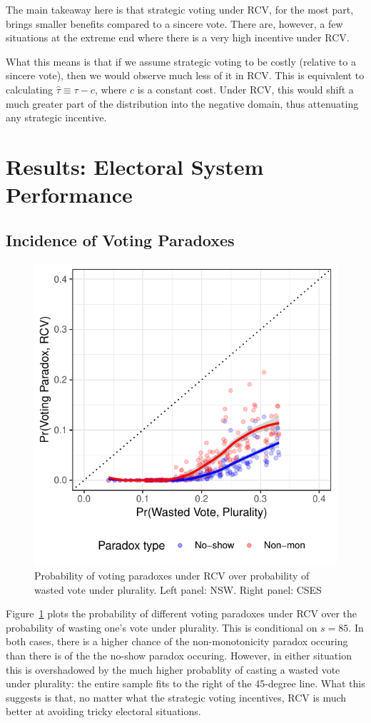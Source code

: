 \documentclass[11pt, letter]{article}
\begin{document}
The main takeaway here is that strategic voting under RCV, for the most part, brings smaller benefits compared to a sincere vote. There are, however, a few situations at the extreme end where there is a very high incentive under RCV.

What this means is that if we assume strategic voting to be costly (relative to a sincere vote), then we would observe much less of it in RCV. This is equivalent to calculating $\hat{\tau} \equiv \tau - c$, where $c$ is a constant cost. Under RCV, this would shift a much greater part of the distribution into the negative domain, thus attenuating any strategic incentive.

\section{Results: Electoral System Performance}
\subsection{Incidence of Voting Paradoxes}

\begin{figure}[!h]
	\centering
	\includegraphics[width = .6 \textwidth]{"../output/figures/paradoxes_cses"}
	\caption{Probability of voting paradoxes under RCV over probability of wasted vote under plurality. Left panel: NSW. Right panel: CSES}
	\label{fig:paradox}
\end{figure}

Figure~\ref{fig:paradox} plots the probability of different voting paradoxes under RCV over the probability of wasting one's vote under plurality. This is conditional on $s = 85$. In both cases, there is a higher chance of the non-monotonicity paradox occuring than there is of the the no-show paradox occuring. However, in either situation this is overshadowed by the much higher probablity of casting a wasted vote under plurality: the entire sample fits to the right of the 45-degree line. What this suggests is that, no matter what the strategic voting incentives, RCV is much better at avoiding tricky electoral situations.
\end{document}
